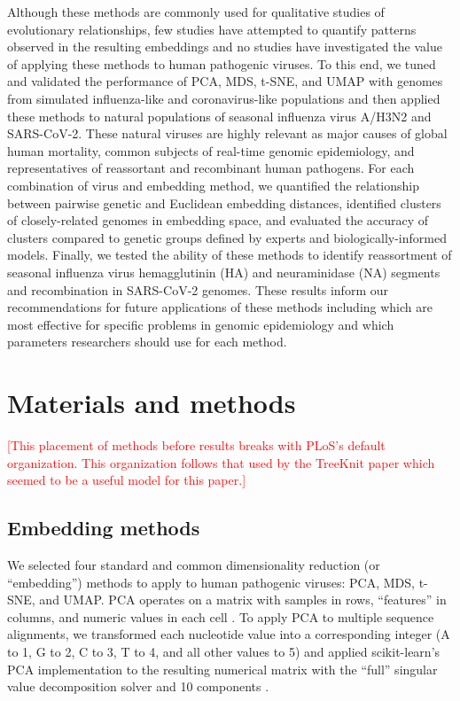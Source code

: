 \documentclass[10pt,letterpaper]{article}
\def\jhc#1{\textcolor{red}{[#1]}}
\begin{document}
Although these methods are commonly used for qualitative studies of evolutionary relationships, few studies have attempted to quantify patterns observed in the resulting embeddings and no studies have investigated the value of applying these methods to human pathogenic viruses.
To this end, we tuned and validated the performance of PCA, MDS, t-SNE, and UMAP with genomes from simulated influenza-like and coronavirus-like populations and then applied these methods to natural populations of seasonal influenza virus A/H3N2 and SARS-CoV-2.
These natural viruses are highly relevant as major causes of global human mortality, common subjects of real-time genomic epidemiology, and representatives of reassortant and recombinant human pathogens.
For each combination of virus and embedding method, we quantified the relationship between pairwise genetic and Euclidean embedding distances, identified clusters of closely-related genomes in embedding space, and evaluated the accuracy of clusters compared to genetic groups defined by experts and biologically-informed models.
Finally, we tested the ability of these methods to identify reassortment of seasonal influenza virus hemagglutinin (HA) and neuraminidase (NA) segments and recombination in SARS-CoV-2 genomes.
These results inform our recommendations for future applications of these methods including which are most effective for specific problems in genomic epidemiology and which parameters researchers should use for each method.

\section*{Materials and methods}
\jhc{This placement of methods before results breaks with PLoS's default organization. This organization follows that used by the TreeKnit paper which seemed to be a useful model for this paper.}

\subsection*{Embedding methods}

We selected four standard and common dimensionality reduction (or ``embedding'') methods to apply to human pathogenic viruses: PCA, MDS, t-SNE, and UMAP.
PCA operates on a matrix with samples in rows, ``features'' in columns, and numeric values in each cell \cite{jolliffe_cadima_2016}.
To apply PCA to multiple sequence alignments, we transformed each nucleotide value into a corresponding integer (A to 1, G to 2, C to 3, T to 4, and all other values to 5) and applied scikit-learn's PCA implementation to the resulting numerical matrix with the ``full'' singular value decomposition solver and 10 components \cite{Pedregosa2011}.
\end{document}

